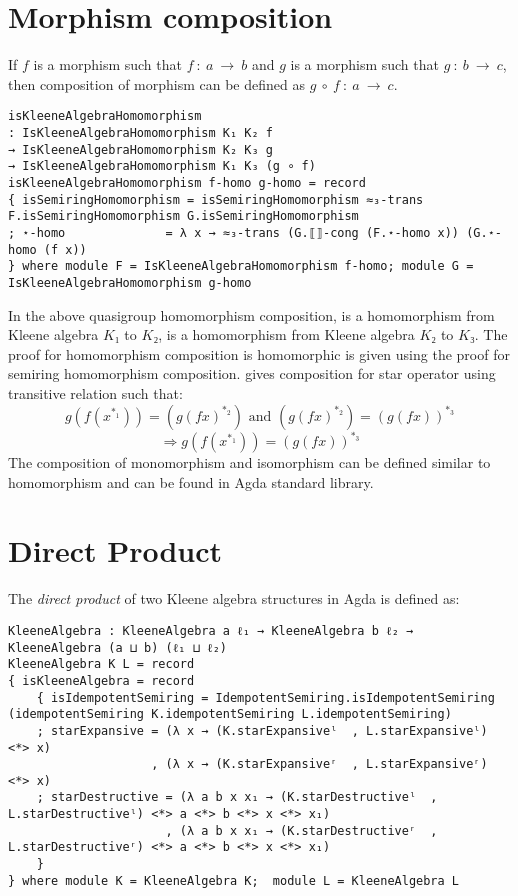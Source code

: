 \section{Morphism composition}
If $f$ is a morphism such that $f\ :\ a \ \rightarrow \ b$ and $g$ is a morphism
such that $g\ :\ b\ \rightarrow \ c$, then composition of morphism can be
defined as $g \ ∘\ f\ :\ a \ \rightarrow \ c$.
\begin{verbatim}
isKleeneAlgebraHomomorphism
: IsKleeneAlgebraHomomorphism K₁ K₂ f
→ IsKleeneAlgebraHomomorphism K₂ K₃ g
→ IsKleeneAlgebraHomomorphism K₁ K₃ (g ∘ f)
isKleeneAlgebraHomomorphism f-homo g-homo = record
{ isSemiringHomomorphism = isSemiringHomomorphism ≈₃-trans F.isSemiringHomomorphism G.isSemiringHomomorphism
; ⋆-homo              = λ x → ≈₃-trans (G.⟦⟧-cong (F.⋆-homo x)) (G.⋆-homo (f x))
} where module F = IsKleeneAlgebraHomomorphism f-homo; module G = IsKleeneAlgebraHomomorphism g-homo
\end{verbatim}
In the above quasigroup homomorphism composition,  is a homomorphism
from Kleene algebra $K₁$ to $K₂$,  is a homomorphism from Kleene
algebra $K₂$ to $K₃$. The proof for homomorphism composition is homomorphic is
given using the proof for semiring homomorphism composition. 
gives composition for star operator using transitive relation such that: 
\[g (f (x^{*_1})) = (g (f x) ^{*_2}) \text{ and } (g (f x) ^{*_2}) = (g (f x))^{*_3}\] 
\[\Rightarrow g (f (x^{*_1})) = (g (f x))^{*_3}\] The composition of
monomorphism and isomorphism can be defined similar to homomorphism and can be
found in Agda standard library.

\section{Direct Product}
The \textit{direct product} of two Kleene algebra structures in Agda is defined
as:
\begin{verbatim}
KleeneAlgebra : KleeneAlgebra a ℓ₁ → KleeneAlgebra b ℓ₂ → KleeneAlgebra (a ⊔ b) (ℓ₁ ⊔ ℓ₂)
KleeneAlgebra K L = record
{ isKleeneAlgebra = record
    { isIdempotentSemiring = IdempotentSemiring.isIdempotentSemiring (idempotentSemiring K.idempotentSemiring L.idempotentSemiring)
    ; starExpansive = (λ x → (K.starExpansiveˡ  , L.starExpansiveˡ) <*> x)
                    , (λ x → (K.starExpansiveʳ  , L.starExpansiveʳ) <*> x)
    ; starDestructive = (λ a b x x₁ → (K.starDestructiveˡ  , L.starDestructiveˡ) <*> a <*> b <*> x <*> x₁)
                      , (λ a b x x₁ → (K.starDestructiveʳ  , L.starDestructiveʳ) <*> a <*> b <*> x <*> x₁)
    }
} where module K = KleeneAlgebra K;  module L = KleeneAlgebra L
\end{verbatim}

